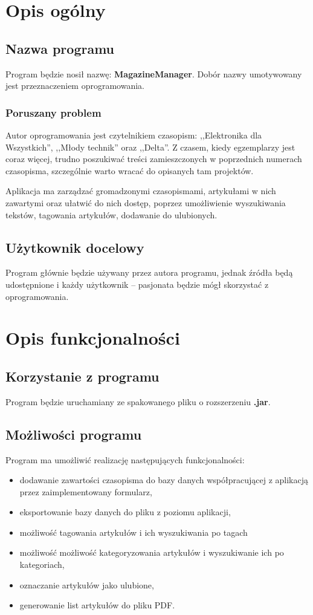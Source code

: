 \section{Opis ogólny}
\subsection{Nazwa programu}
Program będzie nosił nazwę: \textbf{MagazineManager}. Dobór nazwy umotywowany jest przeznaczeniem oprogramowania. 

\subsubsection{Poruszany problem}
Autor oprogramowania jest czytelnikiem czasopism: ,,Elektronika dla Wszystkich'', ,,Młody technik'' oraz ,,Delta''. Z czasem, kiedy egzemplarzy jest coraz więcej, trudno poszukiwać treści zamieszczonych w poprzednich numerach czasopisma, szczególnie warto wracać do opisanych tam projektów.

Aplikacja ma zarządzać gromadzonymi czasopismami, artykułami w nich zawartymi oraz ułatwić do nich dostęp, poprzez umożliwienie wyszukiwania tekstów, tagowania artykułów, dodawanie do ulubionych. 

\subsection{Użytkownik docelowy}
Program głównie będzie używany przez autora programu, jednak źródła będą udostępnione i każdy użytkownik -- pasjonata będzie mógł skorzystać z oprogramowania.

\section{Opis funkcjonalności}
\subsection{Korzystanie z programu}
Program będzie uruchamiany ze spakowanego pliku o rozszerzeniu \textbf{.jar}. 

\subsection{Możliwości programu}
Program ma umożliwić realizację następujących funkcjonalności:
\begin{itemize}
\item dodawanie zawartości czasopisma do bazy danych współpracującej z aplikacją przez zaimplementowany formularz,
\item eksportowanie bazy danych do pliku z poziomu aplikacji,
\item możliwość tagowania artykułów i ich wyszukiwania po tagach
\item możliwość możliwość kategoryzowania artykułów i wyszukiwanie ich po kategoriach,
\item oznaczanie artykułów jako ulubione,
\item generowanie list artykułów do pliku PDF.
\end{itemize}


